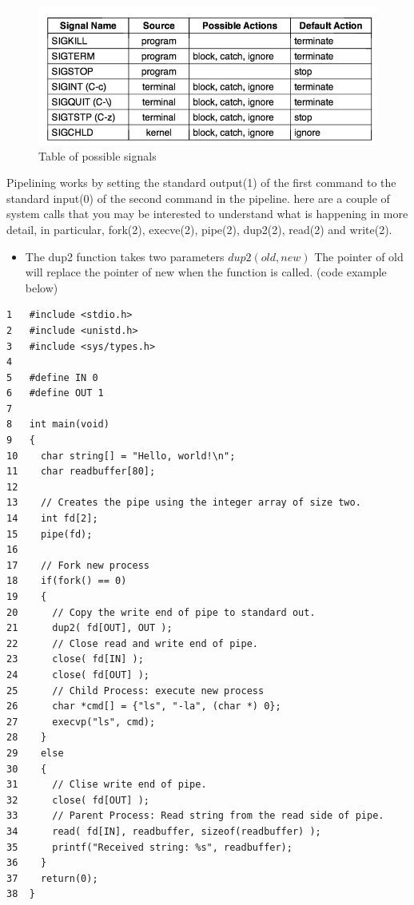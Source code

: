 \documentclass[15pt,idxtotoc,hyperref,openany]{labbook} %
\begin{document}
\begin{figure}[H] %
\begin{center}
\includegraphics[width=0.5\linewidth]{signals}
\end{center}
\caption{Table of possible signals}
\label{fig:example_figure}
\end{figure}



Pipelining works by setting the standard output(1) of the first command to the standard input(0) of the second command in the pipeline.  
here are a couple of system calls that you may be interested to understand what is happening in more detail, in particular, fork(2), 
execve(2), pipe(2), dup2(2), read(2) and write(2).

\begin{itemize}
\item The dup2 function takes two parameters $dup2(old, new)$  The pointer of old will replace the pointer of new when the function is called. (code example below)
\end{itemize}

 \newpage
\begin{lstlisting}
1	#include <stdio.h>
2	#include <unistd.h>
3	#include <sys/types.h>
4	
5	#define IN 0
6	#define OUT 1
7	
8	int main(void)
9	{
10	  char string[] = "Hello, world!\n";
11	  char readbuffer[80];
12	
13	  // Creates the pipe using the integer array of size two.
14	  int fd[2];
15	  pipe(fd);
16	
17	  // Fork new process
18	  if(fork() == 0)
19	  {
20	    // Copy the write end of pipe to standard out.
21	    dup2( fd[OUT], OUT );
22	    // Close read and write end of pipe.
23	    close( fd[IN] );
24	    close( fd[OUT] );
25	    // Child Process: execute new process
26	    char *cmd[] = {"ls", "-la", (char *) 0};
27	    execvp("ls", cmd);
28	  }
29	  else
30	  {
31	    // Clise write end of pipe.
32	    close( fd[OUT] );
33	    // Parent Process: Read string from the read side of pipe.
34	    read( fd[IN], readbuffer, sizeof(readbuffer) );
35	    printf("Received string: %s", readbuffer);
36	  }
37	  return(0);
38	}
\end{lstlisting}
\end{document}
